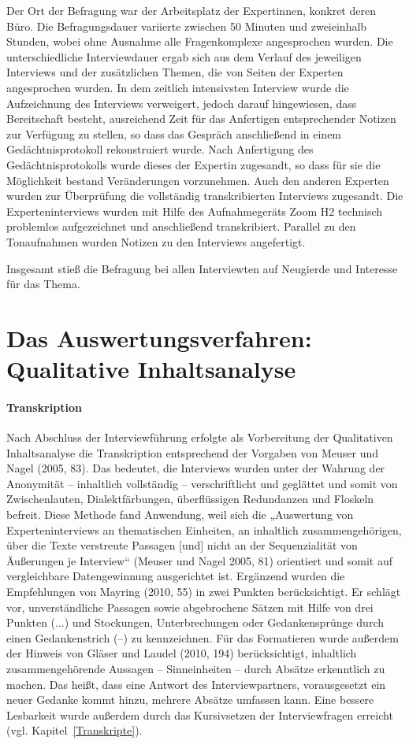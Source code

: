 Der Ort der Befragung war der Arbeitsplatz der Expertinnen, konkret deren Büro. Die Befragungsdauer variierte zwischen 50 Minuten und zweieinhalb Stunden, wobei ohne Ausnahme alle Fragenkomplexe angesprochen wurden. Die unterschiedliche Interviewdauer ergab sich aus dem Verlauf des jeweiligen Interviews und der zusätzlichen Themen, die von Seiten der Experten angesprochen wurden. In dem zeitlich intensivsten Interview wurde die Aufzeichnung des Interviews verweigert, jedoch darauf hingewiesen, dass Bereitschaft besteht, ausreichend Zeit für das Anfertigen entsprechender Notizen zur Verfügung zu stellen, so dass das Gespräch anschließend in einem Gedächtnisprotokoll rekonstruiert wurde. Nach Anfertigung des Gedächtnisprotokolls wurde dieses der Expertin zugesandt, so dass für sie die Möglichkeit bestand Veränderungen vorzunehmen. Auch den anderen Experten wurden zur Überprüfung die vollständig transkribierten Interviews zugesandt. 
Die Experteninterviews wurden mit Hilfe des Aufnahmegeräts Zoom H2 technisch problemlos aufgezeichnet und anschließend transkribiert. Parallel zu den Tonaufnahmen wurden Notizen zu den Interviews angefertigt.  

Insgesamt stieß die Befragung bei allen Interviewten auf Neugierde und Interesse für das Thema.

\section{Das Auswertungsverfahren: Qualitative Inhaltsanalyse}

\paragraph{Transkription} Nach Abschluss der Interviewführung erfolgte als Vorbereitung der Qualitativen Inhaltsanalyse die Transkription entsprechend der Vorgaben von Meuser und Nagel (2005, 83). Das bedeutet, die Interviews wurden unter der Wahrung der Anonymität -- inhaltlich vollständig -- verschriftlicht und geglättet und somit von Zwischenlauten, Dialektfärbungen, überflüssigen Redundanzen und Floskeln befreit. Diese Methode fand Anwendung, weil sich die „Auswertung von Experteninterviews an thematischen Einheiten, an inhaltlich zusammengehörigen, über die Texte verstreute Passagen [und] nicht an der Sequenzialität von Äußerungen je Interview“ (Meuser und Nagel 2005, 81) orientiert und somit auf vergleichbare Datengewinnung ausgerichtet ist. 
Ergänzend wurden die Empfehlungen von Mayring (2010, 55) in zwei Punkten berücksichtigt. Er schlägt vor, unverständliche Passagen sowie abgebrochene Sätzen mit Hilfe von drei Punkten (...) und Stockungen, Unterbrechungen oder Gedankensprünge durch einen Gedankenstrich (--) zu kennzeichnen. 
Für das Formatieren wurde außerdem der Hinweis von Gläser und Laudel (2010, 194) berücksichtigt, inhaltlich zusammengehörende Aussagen -- Sinneinheiten -- durch Absätze erkenntlich zu machen. Das heißt, dass eine Antwort des Interviewpartners, vorausgesetzt ein neuer Gedanke kommt hinzu, mehrere Absätze umfassen kann. Eine bessere Lesbarkeit wurde außerdem durch das Kursivsetzen der Interviewfragen erreicht (vgl. Kapitel~\ref{Transkripte}). 

